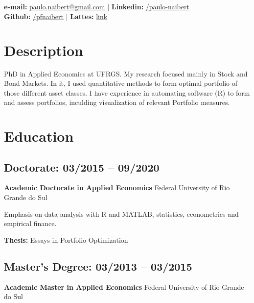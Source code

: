 \documentclass[10pt, a4paper]{article}
\author{Paulo Ferreira Naibert}
\makeatletter
\newcommand{\ufrgs}{{Federal University of Rio Grande do Sul}}
\renewcommand{\maketitle}{
\begin{center}
{\huge\bfseries\theauthor}
\\
\\
\vspace{.25em}
\textbf{e-mail:} \href{mailto:paulo.naibert@gmail.com}{paulo.naibert@gmail.com} |
\textbf{Linkedin:} \href{https://www.linkedin.com/in/paulo-naibert}{/paulo-naibert}
\\
\textbf{Github:} \href{https://github.com/pfnaibert}{/pfnaibert} |
\textbf{Lattes:} \href{http://lattes.cnpq.br/1511789633871437}{link}
\end{center}
}
\makeatother
\begin{document}

\maketitle

\vspace{-12pt}
\section{Description}
PhD in Applied Economics at UFRGS.
My research focused mainly in Stock and Bond Markets.
In it, I used quantitative methods to form optimal portfolio of those different asset classes.
I have experience in automating software (R) to form and assess portfolios, inculding visualization of relevant Portfolio measures.

\vspace{-12pt}
\section{Education}

\subsection{Doctorate: 03/2015 -- 09/2020}
\textbf{Academic Doctorate in Applied Economics}
\ufrgs{}

Emphasis on data analysis with R and MATLAB, statistics, econometrics and empirical finance.

\textbf{Thesis:} Essays in Portfolio Optimization

\vspace{-12pt}
\subsection{Master's Degree: 03/2013 -- 03/2015}
\textbf{Academic Master in Applied Economics}
\ufrgs{}

\end{document}
